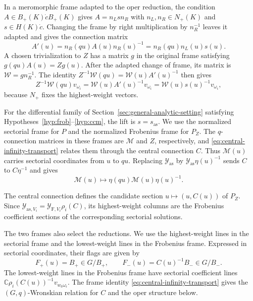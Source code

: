 \documentclass[11pt,leqno]{amsart}
\numberwithin{equation}{section}
\theoremstyle{plain}
\theoremstyle{definition}
\theoremstyle{plain}
\theoremstyle{definition}
\theoremstyle{remark}
\begin{document}
In a meromorphic frame adapted to the oper reduction, the condition $A\in B_+(K)\dot c B_+(K)$ gives $A=n_L s n_R$ with $n_L,n_R\in N_+(K)$ and $s\in H(K)\dot c$. Changing the frame by right multiplication by $n_R^{-1}$ leaves it adapted and gives the connection matrix
\[
 A'(u)=n_R(qu)A(u)n_R(u)^{-1}=n_R(qu)n_L(u)s(u).
\]
A chosen trivialization to $Z$ has a matrix $g$ in the original frame satisfying $g(qu)A(u)=Zg(u)$. After the adapted change of frame, its matrix is $\mathscr W=g n_R^{-1}$. The identity $Z^{-1}\mathscr W(qu)=\mathscr W(u)A'(u)^{-1}$ then gives
\[
 Z^{-1}\mathscr W(qu)v_{\omega_i}
 =\mathscr W(u)A'(u)^{-1}v_{\omega_i}
 =\mathscr W(u)s(u)^{-1}v_{\omega_i},
\]
because $N_+$ fixes the highest-weight vectors.

For the differential family of Section~\ref{sec:general-analytic-setting} satisfying Hypotheses~\ref{hyp:frob}--\ref{hyp:ccm}, the lift is $s=s_{\mathrm{as}}$. We use the normalized sectorial frame for $P$ and the normalized Frobenius frame for $P_Z$. The $q$-connection matrices in these frames are $\mathscr M$ and $Z$, respectively, and \eqref{eq:central-infinity-transport} relates them through the central connection $C$. Thus $\mathscr M(u)$ carries sectorial coordinates from $u$ to $qu$.
Replacing $\mathcal Y_{\mathrm{as}}$ by $\mathcal Y_{\mathrm{as}}\eta(u)^{-1}$ sends $C$ to $C\eta^{-1}$ and gives
\[
 \mathscr M(u)\longmapsto\eta(qu)\mathscr M(u)\eta(u)^{-1}.
\]

The central connection defines the candidate section $u\mapsto(u,C(u))$ of $P_Z$.  Since $\mathcal Y_{\mathrm{as},V_i}=\mathcal Y_{\mathrm F,V_i}\rho_i(C)$, its highest-weight columns are the Frobenius coefficient sections of the corresponding sectorial solutions.

The two frames also select the reductions. We use the highest-weight lines in the sectorial frame and the lowest-weight lines in the Frobenius frame. Expressed in sectorial coordinates, their flags are given by
\[
 F_+(u)=B_+\in G/B_+,
 \qquad
 F_-(u)=C(u)^{-1}B_-\in G/B_-.
\]
The lowest-weight lines in the Frobenius frame have sectorial coefficient lines $\mathbb C\rho_i(C(u))^{-1}v_{w_0\omega_i}$.  The frame identity \eqref{eq:central-infinity-transport} gives the $(G,q)$-Wronskian relation for $C$ and the oper structure below.
\end{document}
